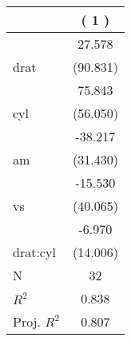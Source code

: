 
\begin{tabular}{lc}
\toprule
 & ( 1 )\\
\midrule
 & 27.578\\

\multirow{-2}{*}{\raggedright\arraybackslash drat} & (90.831)\\

 & 75.843\\

\multirow{-2}{*}{\raggedright\arraybackslash cyl} & (56.050)\\

 & -38.217\\

\multirow{-2}{*}{\raggedright\arraybackslash am} & (31.430)\\

 & -15.530\\

\multirow{-2}{*}{\raggedright\arraybackslash vs} & (40.065)\\

 & -6.970\\

\multirow{-2}{*}{\raggedright\arraybackslash drat:cyl} & (14.006)\\

\midrule
N & 32\\

$R^2$ & 0.838\\

Proj. $R^2$ & 0.807\\
\bottomrule
\end{tabular}
